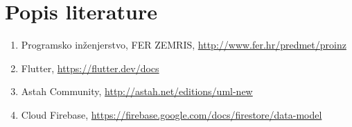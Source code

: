 \chapter*{Popis literature}
		
		\begin{enumerate}
			
			
			\item  Programsko inženjerstvo, FER ZEMRIS, \url{http://www.fer.hr/predmet/proinz}
			
			\item Flutter,
			\url{https://flutter.dev/docs}
			
			\item  Astah Community, \url{http://astah.net/editions/uml-new}
			
			\item  Cloud Firebase, \url{https://firebase.google.com/docs/firestore/data-model}
			
			
		\end{enumerate}
		
		 